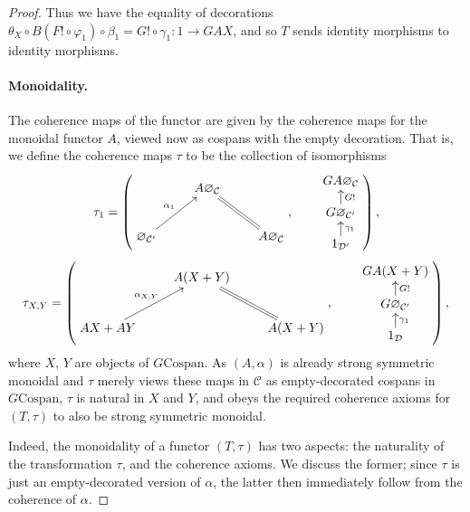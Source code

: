 \begin{proof}
Thus
we have the equality of decorations $\theta_X \circ B(F! \circ \varphi_1) \circ
\beta_1
= G! \circ \gamma_1\colon  1 \to GAX$, and so $T$ sends identity morphisms to
identity morphisms.

\paragraph{Monoidality.} The coherence maps of the functor are given by the coherence maps for the
  monoidal functor $A$, viewed now as cospans with the empty decoration. That
  is, we define the coherence maps $\tau$ to be the collection of isomorphisms
  \[
    \tau_1 = 
    \left(
    \begin{aligned}
      \xymatrix{
	& A\varnothing_{\mathcal C} \\  
	\varnothing_{\mathcal C'} \ar[ur]^{\alpha_1} && A\varnothing_{\mathcal
	C} \ar@{=}[ul]
      }
    \end{aligned}
    ,
    \qquad
    \begin{aligned}
      \xymatrixrowsep{.9pc}
      \xymatrix{
	GA\varnothing_{\mathcal C} \\
	G\varnothing_{\mathcal C'} \ar[u]_{G!} \\
	1_{\mathcal D'} \ar[u]_{\gamma_1}
      }
    \end{aligned}
    \right),
  \]
  \[
    \tau_{X,Y}=
    \left(
    \begin{aligned}
      \xymatrix{
	& A(X+Y) \\  
	AX+AY \ar[ur]^{\alpha_{X,Y}} && A(X+Y) \ar@{=}[ul]
      }
    \end{aligned}
    ,
    \qquad
    \begin{aligned}
      \xymatrixrowsep{.9pc}
      \xymatrix{
	GA(X+Y) \\
	G\varnothing_{\mathcal C'} \ar[u]_{G!} \\
	1_{\mathcal D} \ar[u]_{\gamma_1}
      }
    \end{aligned}
    \right),
  \]
  where $X$, $Y$ are objects of $G\mathrm{Cospan}$. As $(A,\alpha)$ is already
  strong symmetric monoidal and $\tau$ merely views these maps in $\mathcal C$
  as empty-decorated cospans in $G\mathrm{Cospan}$, $\tau$ is natural in $X$ and
  $Y$, and obeys the required coherence axioms for $(T,\tau)$ to also be strong
  symmetric monoidal. 

  Indeed, the monoidality of a functor $(T,\tau)$ has two aspects: the naturality
of the transformation $\tau$, and the coherence axioms. We discuss the former;
since $\tau$ is just an empty-decorated version of $\alpha$, the latter then
immediately follow from the coherence of $\alpha$.


\end{proof}
